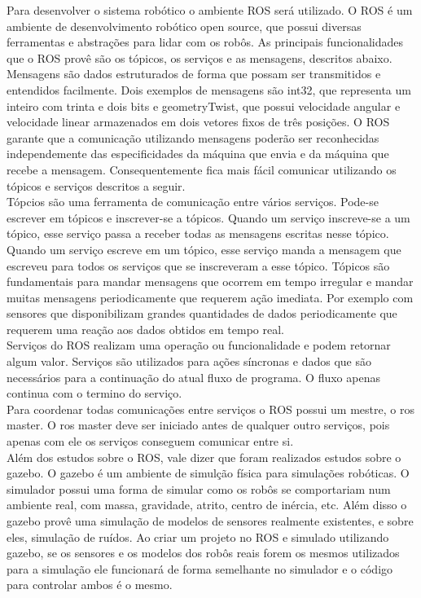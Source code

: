 \documentclass[12pt]{report}
\begin{document}
Para desenvolver o sistema robótico o ambiente ROS será utilizado. O ROS é um ambiente de desenvolvimento robótico open source, que possui diversas ferramentas e abstrações para lidar com os robôs. As principais funcionalidades que o ROS provê são os tópicos, os serviços e as mensagens, descritos abaixo.\\
Mensagens são dados estruturados de forma que possam ser transmitidos e entendidos facilmente. Dois exemplos de mensagens são int32, que representa um inteiro com trinta e dois bits e geometryTwist, que possui velocidade angular e velocidade linear armazenados em dois vetores fixos de três posições. O ROS garante que a comunicação utilizando mensagens poderão ser reconhecidas independemente das especificidades da máquina que envia e da máquina que recebe a mensagem. Consequentemente fica mais fácil comunicar utilizando os tópicos e serviços descritos a seguir.\\
	
Tópcios são uma ferramenta de comunicação entre vários serviços. Pode-se escrever em tópicos e inscrever-se a tópicos. Quando um serviço inscreve-se a um tópico, esse serviço passa a receber todas as mensagens escritas nesse tópico. Quando um serviço escreve em um tópico, esse serviço manda a mensagem que escreveu para todos os serviços que se inscreveram a esse tópico. Tópicos são fundamentais para mandar mensagens que ocorrem em tempo irregular e mandar muitas mensagens periodicamente que requerem ação imediata. Por exemplo com sensores que disponibilizam grandes quantidades de dados periodicamente que requerem uma reação aos dados obtidos em tempo real.\\

Serviços do ROS realizam uma operação ou funcionalidade e podem retornar algum valor. Serviços são utilizados para ações síncronas e dados que são necessários para a continuação do atual fluxo de programa. O fluxo apenas continua com o termino do serviço.\\

Para coordenar todas comunicações entre serviços o ROS possui um mestre, o ros master. O ros master deve ser iniciado antes de qualquer outro serviços, pois apenas com ele os serviços conseguem comunicar entre si.\\

Além dos estudos sobre o ROS, vale dizer que foram realizados estudos sobre o gazebo. O gazebo é um ambiente de simulção física para simulações robóticas. O simulador possui uma forma de simular como os robôs se comportariam num ambiente real, com massa, gravidade, atrito, centro de inércia, etc. Além disso o gazebo provê uma simulação de modelos de sensores realmente existentes, e sobre eles, simulação de ruídos. Ao criar um projeto no ROS e simulado utilizando gazebo, se os sensores e os modelos dos robôs reais forem os mesmos utilizados para a simulação ele funcionará de forma semelhante no simulador e o código para controlar ambos é o mesmo.\\
\end{document}
